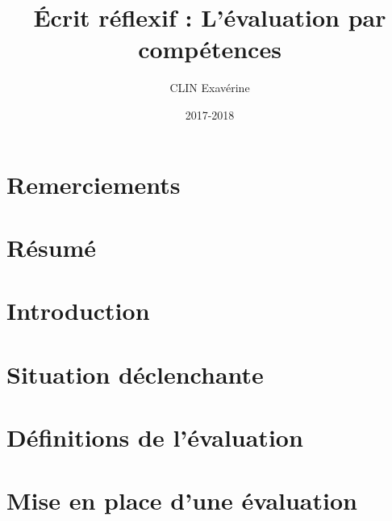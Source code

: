 \documentclass[a4paper, 12pt]{article}
\title{Écrit réflexif : L'évaluation par compétences}
\author{CLIN Exavérine}
\date{2017-2018}
\begin{document}
\maketitle
\thispagestyle{empty}

\newpage
\part*{Remerciements}

\thispagestyle{empty}

\newpage
\part*{Résumé}



\newpage
\tableofcontents

\newpage
\part{Introduction}


\newpage
\part{Situation déclenchante}

\setcounter{section}{0}

\newpage
\part{Définitions de l'évaluation}

\setcounter{section}{0}

\newpage
\part{Mise en place d'une évaluation}

\setcounter{section}{0}

%
\end{document}

